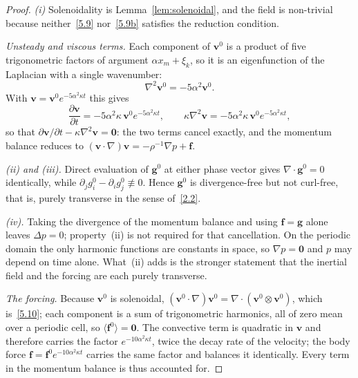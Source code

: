 \documentclass[11pt]{jfm}
\numberwithin{equation}{section}
\begin{document}
\begin{proof}
\emph{(i)} Solenoidality is Lemma~\ref{lem:solenoidal}, and the field is non-trivial because
neither~\eqref{5.9} nor~\eqref{5.9b} satisfies the reduction condition.

\emph{Unsteady and viscous terms.} Each component of $\boldsymbol{v}^0$ is a product of five
trigonometric factors of argument $\alpha x_m+\xi_k$, so it is an eigenfunction of the Laplacian
with a single wavenumber:
\[
\nabla^2\boldsymbol{v}^0=-5\alpha^2\boldsymbol{v}^0 .
\]
With $\boldsymbol{v}=\boldsymbol{v}^0e^{-5\alpha^2\kappa t}$ this gives
\[
\frac{\partial\boldsymbol{v}}{\partial t}=-5\alpha^2\kappa\,\boldsymbol{v}^0e^{-5\alpha^2\kappa t},
\qquad
\kappa\nabla^2\boldsymbol{v}=-5\alpha^2\kappa\,\boldsymbol{v}^0e^{-5\alpha^2\kappa t},
\]
so that $\partial\boldsymbol{v}/\partial t-\kappa\nabla^2\boldsymbol{v}=\boldsymbol{0}$: the two
terms cancel exactly, and the momentum balance reduces to
$(\boldsymbol{v}\cdot\nabla)\boldsymbol{v}=-\rho^{-1}\nabla p+\boldsymbol{f}$.

\emph{(ii) and (iii).} Direct evaluation of $\boldsymbol{g}^0$ at either phase vector gives
$\nabla\cdot\boldsymbol{g}^0=0$ identically, while $\partial_jg_i^0-\partial_ig_j^0\not\equiv0$.
Hence $\boldsymbol{g}^0$ is divergence-free but not curl-free, that is, purely transverse in the
sense of~\eqref{2.2}.

\emph{(iv).} Taking the divergence of the momentum balance and using $\boldsymbol{f}=\boldsymbol{g}$
alone leaves $\Delta p=0$; property~(ii) is not required for that cancellation. On the periodic
domain the only harmonic functions are constants in space, so $\nabla p=\boldsymbol{0}$ and $p$ may
depend on time alone. What~(ii) adds is the stronger statement that the inertial field and the
forcing are each purely transverse.

\emph{The forcing.} Because $\boldsymbol{v}^0$ is solenoidal,
$(\boldsymbol{v}^0\!\cdot\!\nabla)\boldsymbol{v}^0=\nabla\cdot(\boldsymbol{v}^0\otimes
\boldsymbol{v}^0)$, which is~\eqref{5.10}; each component is a sum of trigonometric harmonics, all
of zero mean over a periodic cell, so $\langle\boldsymbol{f}^0\rangle=\boldsymbol{0}$. The
convective term is quadratic in $\boldsymbol{v}$ and therefore carries the factor
$e^{-10\alpha^2\kappa t}$, twice the decay rate of the velocity; the body force
$\boldsymbol{f}=\boldsymbol{f}^0e^{-10\alpha^2\kappa t}$ carries the same factor and balances it
identically. Every term in the momentum balance is thus accounted for.
\end{proof}
\end{document}
